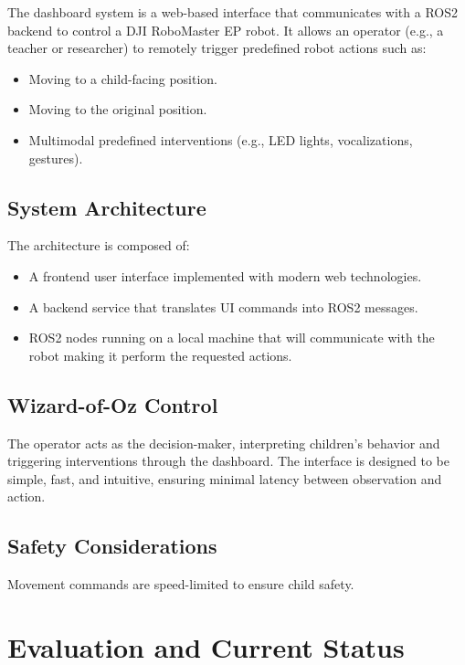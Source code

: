 \documentclass[a4paper]{usiinfbachelorproject}
\begin{document}
The dashboard system is a web-based interface that communicates with a ROS2 backend to control a DJI RoboMaster EP robot. It allows an operator (e.g., a teacher or researcher) to remotely trigger predefined robot actions such as:

\begin{itemize}
    \item Moving to a child-facing position.
    \item Moving to the original position.
    \item Multimodal predefined interventions (e.g., LED lights, vocalizations, gestures).
\end{itemize}

\subsection{\textbf{System Architecture}}
The architecture is composed of:
\begin{itemize}
    \item A frontend user interface implemented with modern web technologies.
    \item A backend service that translates UI commands into ROS2 messages.
    \item ROS2 nodes running on a local machine that will communicate with the robot making it perform the requested actions.
\end{itemize}

\subsection{\textbf{Wizard-of-Oz Control}}
The operator acts as the decision-maker, interpreting children's behavior and triggering interventions through the dashboard. The interface is designed to be simple, fast, and intuitive, ensuring minimal latency between observation and action.

\subsection{\textbf{Safety Considerations}}
Movement commands are speed-limited to ensure child safety.


\section{\textbf{Evaluation and Current Status}}\label{sec:evaluation}
\end{document}
